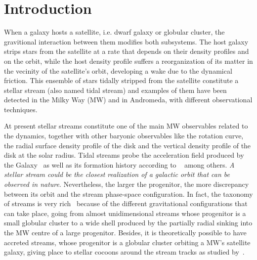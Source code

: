 \documentclass[twocolumn]{aa}
\begin{document}
   \maketitle

\section{Introduction}
When a galaxy hosts a satellite, i.e. dwarf galaxy or globular cluster, the gravitional interaction
between them modifies both subsystems. The host galaxy strips stars from the satellite at a rate
that depends on their density profiles and on the orbit,
while the host density profile suffers a reorganization of its matter in the vecinity of the satellite's orbit, developing a wake due to the dynamical friction.
This ensemble of stars tidally stripped from the satellite constitute a stellar stream (also named tidal stream) and examples of them have been detected in the Milky Way (MW) and in Andromeda, with different observational techniques.

At present stellar streams constitute one of the main MW observables related to the dynamics, together with other baryonic observables like the rotation curve, the radial surface density profile of the disk and the vertical density profile of the disk at the solar radius.
Tidal streams probe the acceleration field produced by the Galaxy~\citep{1999ApJ...512L.109J,1999A&A...348L..49Z,2009ApJ...703L..67L,2013MNRAS.436.2386L,2016ASSL..420..169J,Ibata_2016,2017ApJ...842..120I,2017A&A...603A..65T,2021MNRAS.502.4170R} as well as its formation history according to ~\citet{1999Natur.402...53H,2020ARA&A..58..205H,2022A&A...666A..64R,2023arXiv230708730C} among others.
{\it A stellar stream could be the closest realization of a galactic orbit that can be observed in nature}.
Nevertheless, the larger the progenitor, the more discrepancy between its orbit and the stream phase-space configuration. In fact, the taxonomy of streams is very rich~\citep{2015MNRAS.450..575A} because of the different gravitational configurations that can take place, going from almost unidimensional streams whose progenitor is a small globular cluster to a wide shell produced by the partially radial sinking into the MW centre of a large progenitor. Besides, it is theoretically possible to have accreted streams, whose progenitor is a globular cluster orbiting a MW's satellite galaxy, giving place to stellar cocoons around the
stream tracks as studied by~\citet{2018ApJ...861...69C,2019ApJ...881..106M,2021MNRAS.501..179M,2021ApJ...911L..32G,2022MNRAS.511.2339Q}.
\end{document}
